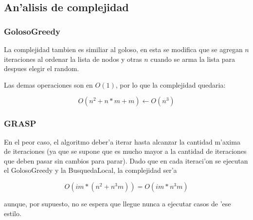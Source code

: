 \subsection{An'alisis de complejidad}
\subsubsection{GolosoGreedy}
La complejidad tambien es similiar al goloso, en esta se modifica que se agregan $n$ iteraciones al ordenar la lista de nodos y otras $n$ cuando se arma la lista para despues elegir el random.

Las demas operaciones son en $O(1)$, por lo que la complejidad quedaria: 

$$O(n^{2}+n*m+m) \leftarrow O(n^3)$$


\subsubsection{GRASP}
En el peor caso, el algoritmo deber'a iterar hasta alcanzar la cantidad m'axima de iteraciones (ya que se supone que es mucho mayor a la cantidad de iteraciones que deben pasar sin cambios para parar). Dado que en cada iteraci'on se ejecutan el GolosoGreedy y la BusquedaLocal, la complejidad ser'a 

$$O(im * (n^2 + n^3m)) = O(im * n^3m)$$

aunque, por supuesto, no se espera que llegue nunca a ejecutar casos de 'ese estilo.
